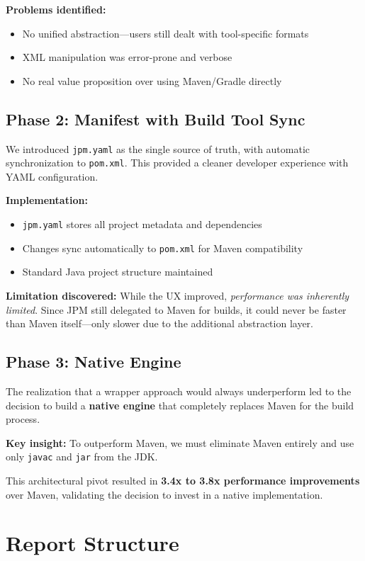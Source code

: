 \documentclass[12pt,a4paper]{report}
\begin{document}
\textbf{Problems identified:}
\begin{itemize}
    \item No unified abstraction—users still dealt with tool-specific formats
    \item XML manipulation was error-prone and verbose
    \item No real value proposition over using Maven/Gradle directly
\end{itemize}

\subsection{Phase 2: Manifest with Build Tool Sync}

We introduced \texttt{jpm.yaml} as the single source of truth, with automatic synchronization to \texttt{pom.xml}. This provided a cleaner developer experience with YAML configuration.

\textbf{Implementation:}
\begin{itemize}
    \item \texttt{jpm.yaml} stores all project metadata and dependencies
    \item Changes sync automatically to \texttt{pom.xml} for Maven compatibility
    \item Standard Java project structure maintained
\end{itemize}

\textbf{Limitation discovered:} While the UX improved, \textit{performance was inherently limited}. Since JPM still delegated to Maven for builds, it could never be faster than Maven itself—only slower due to the additional abstraction layer.

\subsection{Phase 3: Native Engine}

The realization that a wrapper approach would always underperform led to the decision to build a \textbf{native engine} that completely replaces Maven for the build process.

\textbf{Key insight:} To outperform Maven, we must eliminate Maven entirely and use only \texttt{javac} and \texttt{jar} from the JDK.

This architectural pivot resulted in \textbf{3.4x to 3.8x performance improvements} over Maven, validating the decision to invest in a native implementation.

\section{Report Structure}
\end{document}
